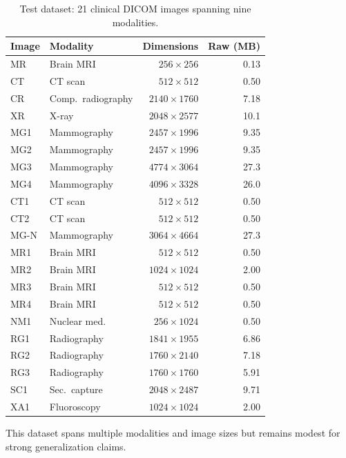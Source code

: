 \documentclass[journal]{IEEEtran}
\begin{document}
\begin{table}[htbp]
\centering
\caption{Test dataset: 21 clinical DICOM images spanning nine modalities.}
\label{tab:dataset}
\scriptsize
\begin{tabular}{llrr}
\toprule
Image & Modality & Dimensions & Raw (MB) \\
\midrule
MR   & Brain MRI      & $256{\times}256$   & 0.13 \\
CT   & CT scan        & $512{\times}512$   & 0.50 \\
CR   & Comp.\ radiography & $2140{\times}1760$ & 7.18 \\
XR   & X-ray          & $2048{\times}2577$ & 10.1 \\
MG1  & Mammography    & $2457{\times}1996$ & 9.35 \\
MG2  & Mammography    & $2457{\times}1996$ & 9.35 \\
MG3  & Mammography    & $4774{\times}3064$ & 27.3 \\
MG4  & Mammography    & $4096{\times}3328$ & 26.0 \\
CT1  & CT scan        & $512{\times}512$   & 0.50 \\
CT2  & CT scan        & $512{\times}512$   & 0.50 \\
MG-N & Mammography    & $3064{\times}4664$ & 27.3 \\
MR1  & Brain MRI      & $512{\times}512$   & 0.50 \\
MR2  & Brain MRI      & $1024{\times}1024$ & 2.00 \\
MR3  & Brain MRI      & $512{\times}512$   & 0.50 \\
MR4  & Brain MRI      & $512{\times}512$   & 0.50 \\
NM1  & Nuclear med.   & $256{\times}1024$  & 0.50 \\
RG1  & Radiography    & $1841{\times}1955$ & 6.86 \\
RG2  & Radiography    & $1760{\times}2140$ & 7.18 \\
RG3  & Radiography    & $1760{\times}1760$ & 5.91 \\
SC1  & Sec.~capture   & $2048{\times}2487$ & 9.71 \\
XA1  & Fluoroscopy    & $1024{\times}1024$ & 2.00 \\
\bottomrule
\end{tabular}
\end{table}

This dataset spans multiple modalities and image sizes but remains modest for
strong generalization claims.
\end{document}
